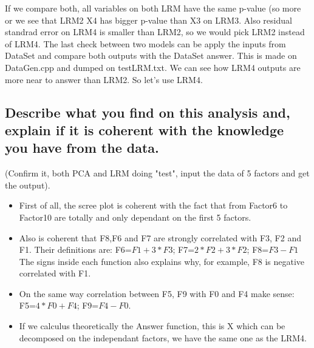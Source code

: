 \documentclass[12pt]{article}
\begin{document}
If we compare both, all variables on both LRM have the same p-value (so more or we see that LRM2 X4 has bigger p-value than X3 on LRM3. Also residual standrad error on LRM4 is smaller than LRM2, so we would pick LRM2 instead of LRM4. The last check between two models can be apply the inputs from DataSet and compare both outputs with the DataSet answer. This is made on DataGen.cpp and dumped on testLRM.txt. We can see how LRM4 outputs are more near to answer than LRM2. So let's use LRM4.


\subsection {Describe what you find on this analysis and, explain if it is coherent with the knowledge you have from the data.}
(Confirm it, both PCA and LRM doing "test", input the data of 5 factors and get the output).
\begin{itemize}
\item  First of all, the scree plot is coherent with the fact that from Factor6 to Factor10 are totally and only dependant on the first 5 factors.
\item Also is coherent that F8,F6 and F7 are strongly correlated with F3, F2 and F1. Their definitions are: F6=$F1 + 3*F3$; F7=$2*F2 + 3*F2$; F8=$F3 - F1$
\\The signs inside each function also explains why, for example, F8 is negative correlated with F1.
\item On the same way correlation between F5, F9 with F0 and F4 make sense:
F5=$4*F0 + F4$; F9=$F4 - F0$.
\item If we calculus theoretically the Answer function, this is X which can be decomposed on the independant factors, we have the same one as the LRM4.

\end{itemize}
\newpage
\end{document}

